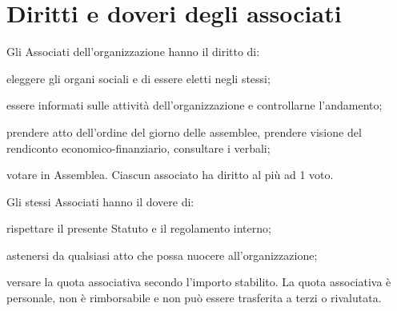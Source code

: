 \documentclass[legalpaper, 11pt]{exam}
\let\tempone\enumerate
\let\temptwo\endenumerate
\renewenvironment{enumerate}{\tempone\addtolength{\itemsep}{-0.45\baselineskip}}{\temptwo}
\begin{document}
\section{Diritti e doveri degli associati}
\begin{enumerate}
 \item Gli Associati dell'organizzazione hanno il diritto di:
 \vspace{-5pt}
 \begin{enumerate}
  \item eleggere gli organi sociali e di essere eletti negli stessi;
  \item essere informati sulle attività dell’organizzazione e controllarne l’andamento;
  \item prendere atto dell’ordine del giorno delle assemblee, prendere visione del rendiconto economico-finanziario, consultare i verbali;
  \item votare in Assemblea. Ciascun associato ha diritto al più ad 1 voto.
 \end{enumerate}
\item Gli stessi Associati hanno il dovere di:
\vspace{-5pt}
\begin{enumerate}
 \item rispettare il presente Statuto e il regolamento interno;
 \item astenersi da qualsiasi atto che possa nuocere all'organizzazione;
 \item versare la quota associativa secondo l’importo stabilito. La quota associativa è personale, non è rimborsabile e non può essere trasferita a terzi o rivalutata.
\end{enumerate}

\end{enumerate}
\end{document}
